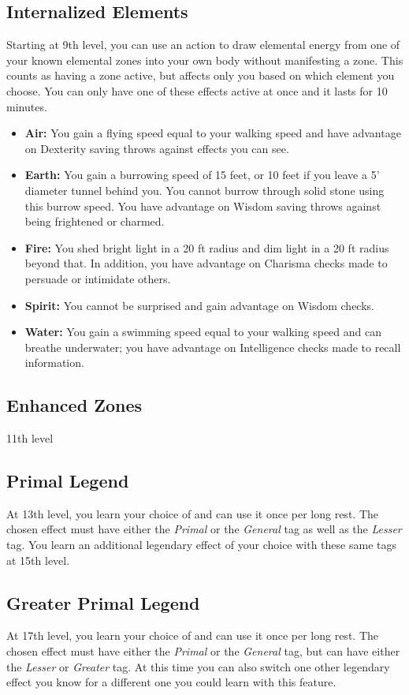 \subsection{Internalized Elements}
Starting at 9th level, you can use an action to draw elemental energy from one of your known elemental zones into your own body without manifesting a zone. This counts as having a zone active, but affects only you based on which element you choose. You can only have one of these effects active at once and it lasts for 10 minutes.
\begin{itemize}
	\item \textbf{Air:} You gain a flying speed equal to your walking speed and have advantage on Dexterity saving throws against effects you can see.
	\item \textbf{Earth:} You gain a burrowing speed of 15 feet, or 10 feet if you leave a 5' diameter tunnel behind you. You cannot burrow through solid stone using this burrow speed. You have advantage on Wisdom saving throws against being frightened or charmed.
	\item \textbf{Fire:} You shed bright light in a 20 ft radius and dim light in a 20 ft radius beyond that. In addition, you have advantage on Charisma checks made to persuade or intimidate others.
	\item \textbf{Spirit:} You cannot be surprised and gain advantage on Wisdom checks.
	\item \textbf{Water:} You gain a swimming speed equal to your walking speed and can breathe underwater; you have advantage on Intelligence checks made to recall information.
\end{itemize}

\subsection{Enhanced Zones}
11th level

\subsection{Primal Legend}
At 13th level, you learn your choice of  and can use it once per long rest. The chosen effect must have either the \textit{Primal} or the \textit{General} tag as well as the \textit{Lesser} tag. You learn an additional legendary effect of your choice with these same tags at 15th level.

\subsection{Greater Primal Legend}
At 17th level, you learn your choice of  and can use it once per long rest. The chosen effect must have either the \textit{Primal} or the \textit{General} tag, but can have either the \textit{Lesser} or \textit{Greater} tag. At this time you can also switch one other legendary effect you know for a different one you could learn with this feature.

